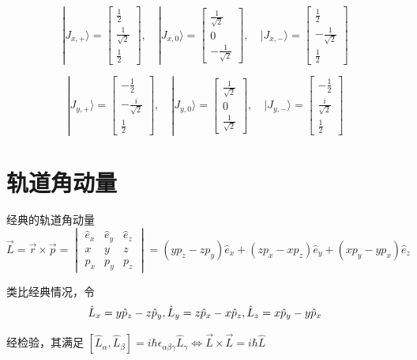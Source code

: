 \documentclass[lang=cn,10pt]{elegantbook}
\begin{document}
\[
|J_{x,+}\rangle = \begin{bmatrix} \frac{1}{2} \\ \frac{1}{\sqrt{2}} \\ \frac{1}{2} \end{bmatrix}, \quad |J_{x,0}\rangle = \begin{bmatrix} \frac{1}{\sqrt{2}} \\ 0 \\ -\frac{1}{\sqrt{2}} \end{bmatrix}, \quad |J_{x,-}\rangle = \begin{bmatrix} \frac{1}{2} \\ -\frac{1}{\sqrt{2}} \\ \frac{1}{2} \end{bmatrix}
\]

\[
|J_{y,+}\rangle = \begin{bmatrix} -\frac{1}{2} \\ -\frac{i}{\sqrt{2}} \\ \frac{1}{2} \end{bmatrix}, \quad |J_{y,0}\rangle = \begin{bmatrix} \frac{1}{\sqrt{2}} \\ 0 \\ \frac{1}{\sqrt{2}} \end{bmatrix}, \quad |J_{y,-}\rangle = \begin{bmatrix} -\frac{1}{2} \\ \frac{i}{\sqrt{2}} \\ \frac{1}{2} \end{bmatrix}
\]

\section{轨道角动量}

经典的轨道角动量
\[
\vec{L} = \vec{r} \times \vec{p} = \begin{vmatrix}
	\hat{e}_x & \hat{e}_y & \hat{e}_z \\
	x & y & z \\
	p_x & p_y & p_z
\end{vmatrix} = (y p_z - z p_y) \hat{e}_x + (z p_x - x p_z) \hat{e}_y + (x p_y - y p_x) \hat{e}_z
\]

类比经典情况，令
\[
\hat{L}_x = y \hat{p}_z - z \hat{p}_y, \\
\hat{L}_y = z \hat{p}_x - x \hat{p}_z, \\
\hat{L}_z = x \hat{p}_y - y \hat{p}_x
\]

经检验，其满足 \([ \hat{L}_\alpha, \hat{L}_\beta ] = i\hbar \epsilon_{\alpha\beta\gamma} \hat{L}_\gamma \Leftrightarrow \vec{L} \times \vec{L} = i\hbar \hat{L}\)
\end{document}
